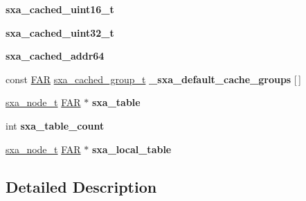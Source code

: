 \begin{DoxyCompactItemize}
\item 
\hypertarget{group___s_x_a_ga3d2a91f4eb47232935501ac9a8711659}{{\bfseries sxa\-\_\-cached\-\_\-uint16\-\_\-t}}\label{group___s_x_a_ga3d2a91f4eb47232935501ac9a8711659}

\item 
\hypertarget{group___s_x_a_ga138eab92aae0a7afd56d36f4824512c8}{{\bfseries sxa\-\_\-cached\-\_\-uint32\-\_\-t}}\label{group___s_x_a_ga138eab92aae0a7afd56d36f4824512c8}

\item 
\hypertarget{group___s_x_a_ga7fc067af06a5c045590e9884073b3f98}{{\bfseries sxa\-\_\-cached\-\_\-addr64}}\label{group___s_x_a_ga7fc067af06a5c045590e9884073b3f98}

\item 
\hypertarget{group___s_x_a_ga88c9810bd98b37f572f8fb294cb02349}{const \hyperlink{group__hal_gaef060b3456fdcc093a7210a762d5f2ed}{F\-A\-R} \hyperlink{structsxa__cached__group__t}{sxa\-\_\-cached\-\_\-group\-\_\-t} {\bfseries \-\_\-sxa\-\_\-default\-\_\-cache\-\_\-groups} \mbox{[}$\,$\mbox{]}}\label{group___s_x_a_ga88c9810bd98b37f572f8fb294cb02349}

\item 
\hypertarget{group___s_x_a_gafaf56c450e4f885ee2d8fd0dfc0bc0a9}{\hyperlink{structsxa__node__t}{sxa\-\_\-node\-\_\-t} \hyperlink{group__hal_gaef060b3456fdcc093a7210a762d5f2ed}{F\-A\-R} $\ast$ {\bfseries sxa\-\_\-table}}\label{group___s_x_a_gafaf56c450e4f885ee2d8fd0dfc0bc0a9}

\item 
\hypertarget{group___s_x_a_gaf690fd80428627087e91a1e1b28fad0f}{int {\bfseries sxa\-\_\-table\-\_\-count}}\label{group___s_x_a_gaf690fd80428627087e91a1e1b28fad0f}

\item 
\hypertarget{group___s_x_a_ga01bfbcf717c18bfb7825eba4715b3ad4}{\hyperlink{structsxa__node__t}{sxa\-\_\-node\-\_\-t} \hyperlink{group__hal_gaef060b3456fdcc093a7210a762d5f2ed}{F\-A\-R} $\ast$ {\bfseries sxa\-\_\-local\-\_\-table}}\label{group___s_x_a_ga01bfbcf717c18bfb7825eba4715b3ad4}

\end{DoxyCompactItemize}


\subsection{Detailed Description}


